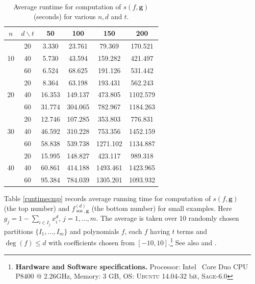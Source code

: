 \documentclass{amsart}
\theoremstyle{definition}
\begin{document}
\begin{table}[ht]{\footnotesize
\caption{Average runtime for computation of $s(f,\mathbf{g})$ (seconds) for various $n, d$ and $t$.}\label{RunTimeTable}
\centering
\begin{tabular}{|c|c|cccc|}
\hline
$n$ & $d\backslash t$ & 50 & 100 & 150 & 200 \\
\hline
\multirow{3}{*}{10} & 20 & 3.330 & 23.761 & 79.369 & 170.521 \\
				    & 40 & 5.730 & 43.594 & 159.282 & 421.497 \\
				    & 60 & 6.524 & 68.625 & 191.126 & 531.442 \\
\hline
\multirow{3}{*}{20} & 20 & 8.364 & 63.198 & 193.431 & 562.243 \\
				    & 40 & 16.353 & 149.137 & 473.805 & 1102.579 \\
				    & 60 & 31.774 & 304.065 & 782.967 & 1184.263 \\
\hline
\multirow{3}{*}{30} & 20 & 12.746 & 107.285 & 353.803 & 776.831 \\
				    & 40 & 46.592 & 310.228 & 753.356 & 1452.159 \\
				    & 60 & 58.838 & 539.738 & 1271.102 & 1134.887 \\
\hline
\multirow{3}{*}{40} & 20 & 15.995 & 148.827 & 423.117 & 989.318 \\
				    & 40 & 60.861 & 414.188 & 1493.461 & 1423.965 \\
				    & 60 & 95.384 & 784.039 & 1305.201 & 1093.932 \\
\hline

\end{tabular}}
\end{table}

Table \ref{runtimecmp} records average running time for computation of $s(f,\mathbf{g})$ (the top number) and $f^{(d)}_{\operatorname{sos},\mathbf{g}}$ (the bottom number) for small examples. Here $g_j = 1 - \sum_{i\in I_j} x_i^d$, $j=1,\dots,m$. The average is taken over 10 randomly chosen partitions $\{I_1,\dots,I_m\}$ and polynomials $f$, each $f$ having $t$ terms and $\deg(f)\le d$ with coefficients chosen from $[-10,10]$.\footnote{\textbf{Hardware and Software
specifications.} Processor: Intel\textregistered~ Core Duo CPU P8400 @ 2.26GHz, Memory: 3 GB, OS: \textsc{Ubuntu}
14.04-32 bit, \textsc{Sage}-6.0} See also \cite[Table 1]{gha-lass-mar} and \cite[Table 2]{gha-mar2}.
\end{document}
